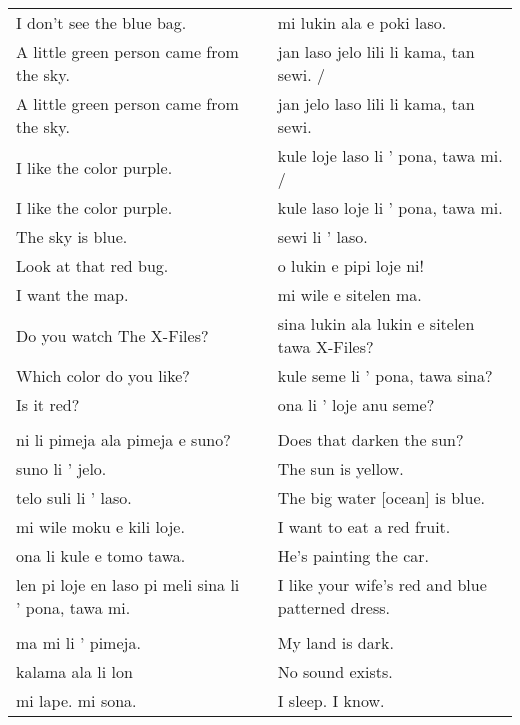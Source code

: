 \begin{supertabular}{p{5,5cm}|ll}
I don't see the blue bag.  && mi lukin ala e poki laso. \\ %
A little green person came from the sky.  && jan laso jelo lili li kama, tan sewi. / \\ %
A little green person came from the sky.  && jan jelo laso lili li kama, tan sewi. \\  %
I like the color purple.  && kule loje laso li ' pona, tawa mi. / \\ %
I like the color purple.  && kule laso loje li ' pona, tawa mi. \\ %
The sky is blue.  && sewi li ' laso. \\ %
Look at that red bug.  && o lukin e pipi loje ni!  \\ %
I want the map.  && mi wile e sitelen ma. \\ %
Do you watch The X-Files?  && sina lukin ala lukin e sitelen tawa X-Files? \\ %
Which color do you like?  && kule seme li ' pona, tawa sina? \\ %
Is it red? && ona li ' loje anu seme?  \\ %
 && \\ %
ni li pimeja ala pimeja e suno? && Does that darken the sun? \\
suno li ' jelo.  && The sun is yellow. \\
telo suli li ' laso.  && The big water [ocean] is blue. \\
mi wile moku e kili loje.  && I want to eat a red fruit. \\
ona li kule e tomo tawa.  && He's painting the car. \\
len pi loje en laso pi meli sina li ' pona, tawa mi. && I like your wife's red and blue patterned dress. \\
 && \\ %
ma mi li ' pimeja. && My land is dark. \\
kalama ala li lon && No sound exists.\\
mi lape. mi sona. && I sleep. I know. \\
\end{supertabular} 

